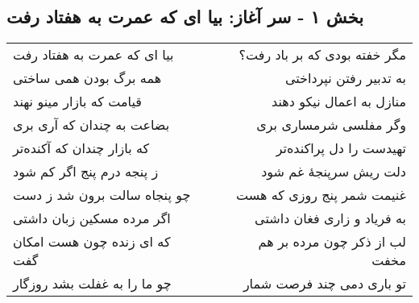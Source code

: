 \begin{center}
\section*{بخش ۱ - سر آغاز: بیا ای که عمرت به هفتاد رفت}
\label{sec:001}
\begin{longtable}{l p{0.5cm} r}
بیا ای که عمرت به هفتاد رفت
&&
مگر خفته بودی که بر باد رفت؟
\\
همه برگ بودن همی ساختی
&&
به تدبیر رفتن نپرداختی
\\
قیامت که بازار مینو نهند
&&
منازل به اعمال نیکو دهند
\\
بضاعت به چندان که آری بری
&&
وگر مفلسی شرمساری بری
\\
که بازار چندان که آکنده‌تر
&&
تهیدست را دل پراکنده‌تر
\\
ز پنجه درم پنج اگر کم شود
&&
دلت ریش سرپنجهٔ غم شود
\\
چو پنجاه سالت برون شد ز دست
&&
غنیمت شمر پنج روزی که هست
\\
اگر مرده مسکین زبان داشتی
&&
به فریاد و زاری فغان داشتی
\\
که ای زنده چون هست امکان گفت
&&
لب از ذکر چون مرده بر هم مخفت
\\
چو ما را به غفلت بشد روزگار
&&
تو باری دمی چند فرصت شمار
\\
\end{longtable}
\end{center}
